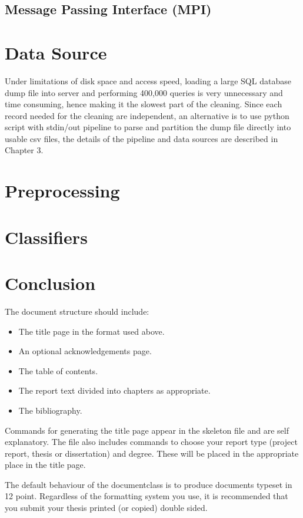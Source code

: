 \documentclass[bsc,logo,twoside,fullspacing,parskip]{infthesis}
\begin{document}
\section{Message Passing Interface (MPI)}


\chapter{Data Source}

Under limitations of disk space and access speed, loading a large SQL database dump file into server and performing 400,000 queries is very unnecessary and time consuming, hence making it the slowest part of the cleaning.
Since each record needed for the cleaning are independent, an alternative is to use python script with stdin/out pipeline to parse and partition the dump file directly into usable csv files, the details of the pipeline and data sources are described in Chapter 3.

\chapter{Preprocessing}

\chapter{Classifiers}

\chapter{Conclusion}

The document structure should include:
\begin{itemize}
\item
The title page  in the format used above.
\item
An optional acknowledgements page.
\item
The table of contents.
\item
The report text divided into chapters as appropriate.
\item
The bibliography.
\end{itemize}

Commands for generating the title page appear in the skeleton file and
are self explanatory.
The file also includes commands to choose your report type (project
report, thesis or dissertation) and degree.
These will be placed in the appropriate place in the title page. 

The default behaviour of the documentclass is to produce documents typeset in
12 point.  Regardless of the formatting system you use, 
it is recommended that you submit your thesis printed (or copied) 
double sided.
\end{document}
